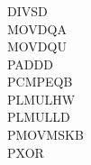 \subsubsection{}

\begin{description}
  \item[DIVSD]
  \item[MOVDQA]
  \item[MOVDQU]
  \item[PADDD]
  \item[PCMPEQB]
  \item[PLMULHW]
  \item[PLMULLD]
  \item[PMOVMSKB]
  \item[PXOR]
\end{description}
\fi

